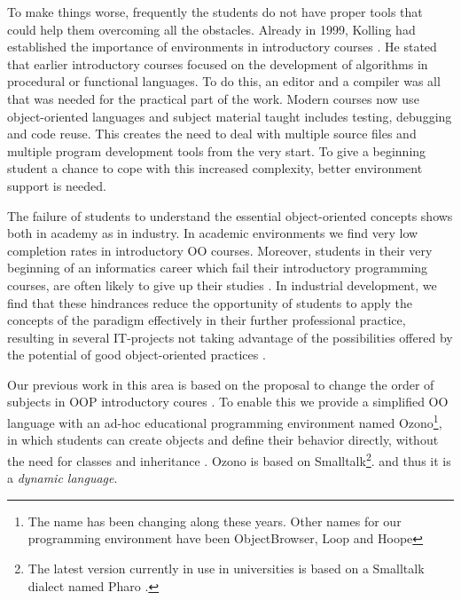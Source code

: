 To make things worse, frequently the students do not have proper tools that could help them overcoming all the obstacles.
Already in 1999, Kolling \etal had established the importance of environments in introductory courses \cite{kolling_problem_1999}. 
He stated that earlier introductory courses focused on the development of algorithms in procedural or functional languages. 
To do this, an editor and a compiler was all that was needed for the practical part of the work. 
Modern courses now use object-oriented languages and subject material taught includes testing, debugging and code reuse. 
This creates the need to deal with multiple source files and multiple program development tools from the very start. 
To give a beginning student a chance to cope with this increased complexity, better environment support is needed. 

\medskip


The failure of students to understand the essential object-oriented concepts shows both in academy as in industry.
In academic environments we find very low completion rates in introductory OO courses.
Moreover, students in their very beginning of an informatics career which fail their introductory programming courses, are often likely to give up their studies \cite{milne_2002}.
In industrial development, we find that these hindrances reduce the opportunity of students to apply
the concepts of the paradigm effectively in their further
professional practice, resulting in several IT-projects not taking
advantage of the possibilities offered by the potential of good
object-oriented practices \cite{lombardi_instances_2007}.

\medskip 


Our previous work in this area is based on the proposal to change the order of subjects in OOP introductory coures \cite{lombardi_instances_2007}.
To enable this we provide a simplified OO language with an ad-hoc educational programming environment 
named Ozono\footnote{The name has been changing along these years. Other names for our programming environment have been ObjectBrowser, Loop and Hoope}, 
in which students can create objects and define their behavior directly, without the need for classes and inheritance \cite{griggio_programming_2011}.
Ozono is based on Smalltalk\footnote{The latest version currently in use in universities is based on a Smalltalk dialect named Pharo \cite{black_pharo_2010}.}.
and thus it is a \textit{dynamic language}.

